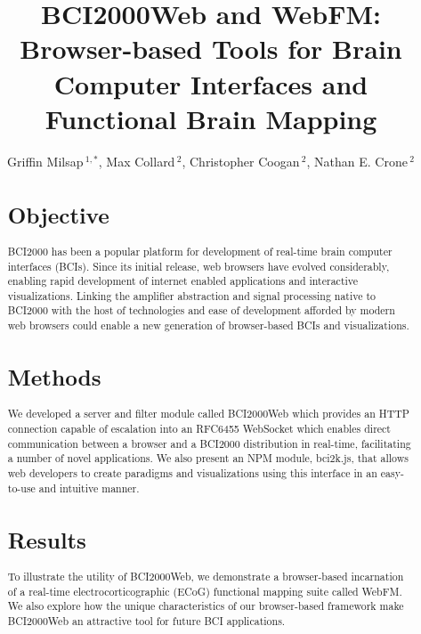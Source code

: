 \documentclass[utf8]{frontiersSCNS}
\def\firstAuthorLast{Milsap {et~al.}} %
\def\Authors{Griffin Milsap\,$^{1,*}$, Max Collard\,$^{2}$, Christopher Coogan\,$^{2}$, Nathan E. Crone\,$^{2}$}
\begin{document}
\onecolumn
{}

\title[BCI2000Web and WebFM]{BCI2000Web and WebFM: Browser-based Tools for Brain Computer Interfaces and Functional Brain Mapping } 

\author[\firstAuthorLast ]{\Authors}
\address{}
\correspondance{}

\extraAuth{}


\maketitle


\begin{abstract}

\section{Objective}
BCI2000 has been a popular platform for development of real-time brain computer interfaces (BCIs).  Since its initial release, web browsers have evolved considerably, enabling rapid development of internet enabled applications and interactive visualizations. Linking the amplifier abstraction and signal processing native to BCI2000 with the host of technologies and ease of development afforded by modern web browsers could enable a new generation of browser-based BCIs and visualizations.

\section{Methods} 
We developed a server and filter module called BCI2000Web which provides an HTTP connection capable of escalation into an RFC6455 WebSocket which enables direct communication between a browser and a BCI2000 distribution in real-time, facilitating a number of novel applications.  We also present an NPM module, bci2k.js, that allows web developers to create paradigms and visualizations using this interface in an easy-to-use and intuitive manner.

\section{Results}
To illustrate the utility of BCI2000Web, we demonstrate a browser-based incarnation of a real-time electrocorticographic (ECoG) functional mapping suite called WebFM. We also explore how the unique characteristics of our browser-based framework make BCI2000Web an attractive tool for future BCI applications.


\end{abstract}
\end{document}
